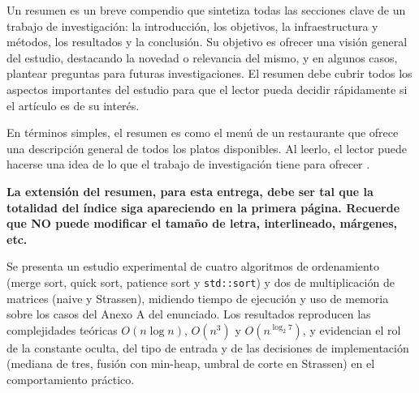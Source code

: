 Un resumen es un breve compendio que sintetiza todas las secciones clave de un trabajo de investigación: la introducción, los objetivos, la infraestructura y métodos, los resultados y la conclusión. Su objetivo es ofrecer una visión general del estudio, destacando la novedad o relevancia del mismo, y en algunos casos, plantear preguntas para futuras investigaciones. El resumen debe cubrir todos los aspectos importantes del estudio para que el lector pueda decidir rápidamente si el artículo es de su interés.

En términos simples, el resumen es como el menú de un restaurante que ofrece una descripción general de todos los platos disponibles. Al leerlo, el lector puede hacerse una idea de lo que el trabajo de investigación tiene para ofrecer \cite{elsevier_abstract_2024}.

\textbf{La extensión del resumen, para esta entrega, debe ser tal que la totalidad del índice siga apareciendo en la primera página. Recuerde que NO puede modificar el tamaño de letra, interlineado, márgenes, etc.}

Se presenta un estudio experimental de cuatro algoritmos de ordenamiento
(merge sort, quick sort, patience sort y \texttt{std::sort}) y dos de
multiplicación de matrices (naive y Strassen), midiendo tiempo de ejecución y
uso de memoria sobre los casos del Anexo A del enunciado. Los resultados
reproducen las complejidades teóricas $O(n\log n)$, $O(n^3)$ y
$O(n^{\log_2 7})$, y evidencian el rol de la constante oculta, del tipo de
entrada y de las decisiones de implementación (mediana de tres, fusión con
min-heap, umbral de corte en Strassen) en el comportamiento práctico.